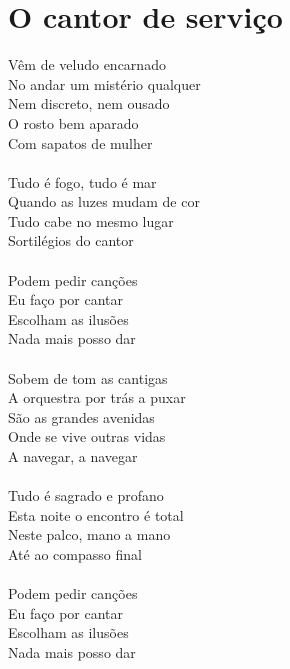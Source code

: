 \documentclass{article}
\begin{document}
\section{ O cantor de serviço}
Vêm de veludo encarnado\\
No andar um mistério qualquer\\
Nem discreto, nem ousado\\
O rosto bem aparado\\
Com sapatos de mulher\\
\\
Tudo é fogo, tudo é mar\\
Quando as luzes mudam de cor\\
Tudo cabe no mesmo lugar\\
Sortilégios do cantor\\
\\
Podem pedir canções\\
Eu faço por cantar\\
Escolham as ilusões\\
Nada mais posso dar\\
\\
Sobem de tom as cantigas\\
A orquestra por trás a puxar\\
São as grandes avenidas\\
Onde se vive outras vidas\\
A navegar, a navegar\\
\\
Tudo é sagrado e profano\\
Esta noite o encontro é total\\
Neste palco, mano a mano\\
Até ao compasso final\\
\\
Podem pedir canções\\
Eu faço por cantar\\
Escolham as ilusões\\
Nada mais posso dar\\
\\
\end{document}
